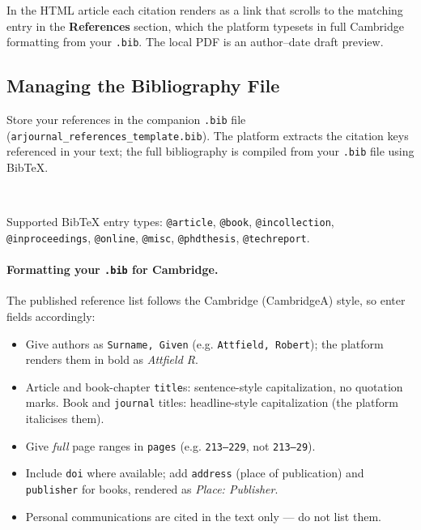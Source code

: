 In the HTML article each citation renders as a link that scrolls to the matching
entry in the \textbf{References} section, which the platform typesets in full
Cambridge formatting from your \texttt{.bib}. The local PDF is an author--date
draft preview.

\subsection{Managing the Bibliography File}

Store your references in the companion \texttt{.bib} file
(\texttt{arjournal\_references\_template.bib}). The platform extracts
the citation keys referenced in your text; the full bibliography is
compiled from your \texttt{.bib} file using BibTeX.

\begin{verbatim}


\end{verbatim}

Supported BibTeX entry types: \texttt{@article}, \texttt{@book},
\texttt{@incollection}, \texttt{@inproceedings}, \texttt{@online},
\texttt{@misc}, \texttt{@phdthesis}, \texttt{@techreport}.

\paragraph{Formatting your \texttt{.bib} for Cambridge.} The published reference
list follows the Cambridge (CambridgeA) style, so enter fields accordingly:
\begin{itemize}
  \item Give authors as \texttt{Surname, Given} (e.g. \texttt{Attfield, Robert});
        the platform renders them in bold as \emph{Attfield R}.
  \item Article and book-chapter \texttt{title}s: sentence-style capitalization,
        no quotation marks. Book and \texttt{journal} titles: headline-style
        capitalization (the platform italicises them).
  \item Give \emph{full} page ranges in \texttt{pages} (e.g. \texttt{213--229},
        not \texttt{213--29}).
  \item Include \texttt{doi} where available; add \texttt{address} (place of
        publication) and \texttt{publisher} for books, rendered as
        \emph{Place: Publisher}.
  \item Personal communications are cited in the text only --- do not list them.
\end{itemize}

